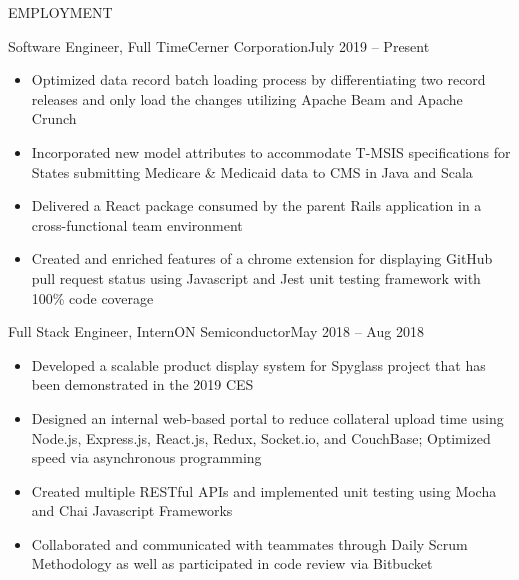 \documentclass[]{mcdowellcv}
\begin{document}
	\makeheader

	\begin{cvsection}{EMPLOYMENT}
		\begin{cvsubsection}{Software Engineer, Full Time}{Cerner Corporation}{July 2019 -- Present}
			\begin{itemize}
                \item Optimized data record batch loading process by differentiating two record releases and only load the changes utilizing Apache Beam and Apache Crunch
				\item Incorporated new model attributes to accommodate T-MSIS specifications for States submitting Medicare \& Medicaid data to CMS in Java and Scala
				\item Delivered a React package consumed by the parent Rails application in a cross-functional team environment
				\item Created and enriched features of a chrome extension for displaying GitHub pull request status using Javascript and Jest unit testing framework with 100\% code coverage
			\end{itemize}
		\end{cvsubsection}

		\begin{cvsubsection}{Full Stack Engineer, Intern}{ON Semiconductor}{May 2018 -- Aug 2018}
			\begin{itemize}
				\item Developed a scalable product display system for Spyglass project that has been demonstrated in the 2019 CES
				\item Designed an internal web-based portal to reduce collateral upload time using Node.js, Express.js, React.js, Redux, Socket.io, and CouchBase; Optimized speed via asynchronous programming
				\item Created multiple RESTful APIs and implemented unit testing using Mocha and Chai Javascript Frameworks
				\item Collaborated and communicated with teammates through Daily Scrum Methodology as well as participated in code review via Bitbucket
			\end{itemize}
		\end{cvsubsection}


\end{cvsection}
\end{document}
